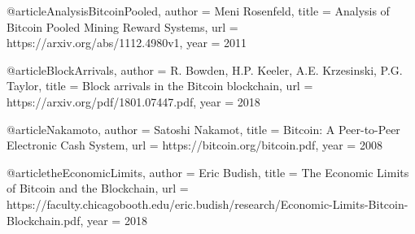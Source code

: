 @article{AnalysisBitcoinPooled,
  author = {Meni Rosenfeld},
  title  = {Analysis of Bitcoin Pooled Mining Reward Systems},
  url    = {https://arxiv.org/abs/1112.4980v1},
  year   = {2011}
}

@article{BlockArrivals,
  author = {R. Bowden, H.P. Keeler, A.E. Krzesinski, P.G. Taylor},
  title  = {Block arrivals in the Bitcoin blockchain},
  url    = {https://arxiv.org/pdf/1801.07447.pdf},
  year   = {2018}
}

@article{Nakamoto,
  author = {Satoshi Nakamot},
  title  = {Bitcoin: A Peer-to-Peer Electronic Cash System},
  url    = {https://bitcoin.org/bitcoin.pdf},
  year   = {2008}
}

@article{theEconomicLimits,
  author = {Eric Budish},
  title  = {The Economic Limits of Bitcoin and the Blockchain},
  url    = {https://faculty.chicagobooth.edu/eric.budish/research/Economic-Limits-Bitcoin-Blockchain.pdf},
  year   = {2018}
}